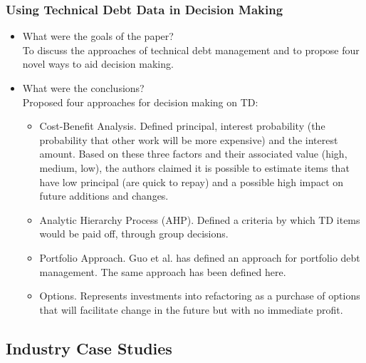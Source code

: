 \documentclass{mprop}
\begin{document}
\subsubsection{Using Technical Debt Data in Decision Making} \cite{Seaman2012}
\begin{itemize}
	\item What were the goals of the paper? \\
	      To discuss the approaches of technical debt management and to
	      propose four novel ways to aid decision making.
	\item What were the conclusions? \\
	      Proposed four approaches for decision making on TD:
	      \begin{itemize}
		      \item Cost-Benefit Analysis. Defined principal, interest
		            probability (the probability that other work will be
		            more expensive) and the interest amount. Based on these
		            three factors and their associated value (high, medium,
		            low), the authors claimed it is possible to estimate
		            items that have low principal (are quick to repay) and a
		            possible high impact on future additions and changes.
		      \item Analytic Hierarchy Process (AHP). Defined a criteria by
		      which TD items would be paid off, through group decisions.
		      \item Portfolio Approach. Guo et al. \cite{Guo2011} has
		      defined an approach for portfolio debt management. The same
		      approach has been defined here.
		      \item Options. Represents investments into refactoring as a
		      purchase of options that will facilitate change in the future
		      but with no immediate profit.
	      \end{itemize}
\end{itemize}

\subsection{Industry Case Studies}
\end{document}
